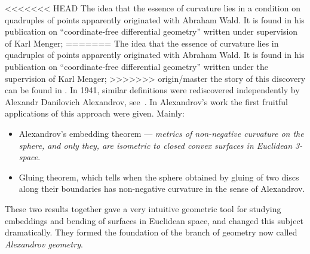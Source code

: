 <<<<<<< HEAD
The idea that the essence of curvature lies in a condition on quadruples of points apparently originated with Abraham Wald.
It is found in his publication on ``coordinate-free differential geometry'' \cite{wald} written under supervision of Karl Menger;
=======
The idea that the essence of curvature lies in quadruples of points apparently originated with Abraham Wald.
It is found in his publication on ``coordinate-free differential geometry'' \cite{wald} written under the supervision of Karl Menger;
>>>>>>> origin/master
the story of this discovery can be found in \cite{menger}.
In 1941, similar definitions were rediscovered independently by 
Alexandr Danilovich Alexandrov,
see~\cite{alexandrov:def}.
In Alexandrov's work the first fruitful applications of this approach were given.
Mainly:
\begin{itemize}
\item Alexandrov's embedding theorem --- 
\textit{metrics of non-negative curvature on the sphere, and only they, are isometric to closed convex surfaces in Euclidean 3-space}. 
\item Gluing theorem, which tells  when the sphere obtained by gluing of two discs along their boundaries has non-negative curvature in the sense of Alexandrov.
\end{itemize}
These two results together gave  a very intuitive geometric tool for studying  embeddings and bending of surfaces in  Euclidean space, and changed this subject dramatically.
They formed the foundation of the branch of geometry now called \emph{Alexandrov geometry}.

